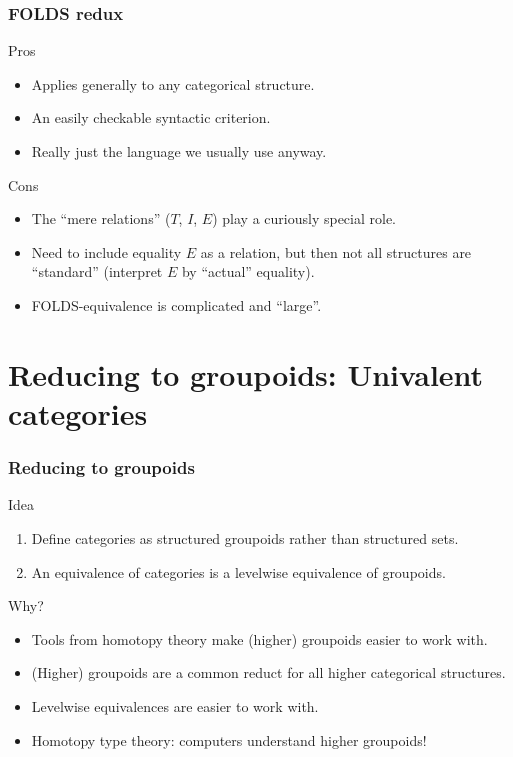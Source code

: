 \documentclass{beamer}
\begin{document}
\begin{frame}
  \frametitle{FOLDS redux}
  \begin{block}{Pros}
    \begin{itemize}
    \item Applies generally to any categorical structure.
    \item An easily checkable syntactic criterion.
    \item Really just the language we usually use anyway.
    \end{itemize}
  \end{block}
  \begin{block}{Cons}
    \begin{itemize}
    \item The ``mere relations'' ($T$, $I$, $E$) play a curiously special role.
    \item Need to include equality $E$ as a relation, but then not all structures are ``standard'' (interpret $E$ by ``actual'' equality).
    \item FOLDS-equivalence is complicated and ``large''.
    \end{itemize}
  \end{block}
\end{frame}

\section{Reducing to groupoids: Univalent categories}
\label{sec:univalence}

\begin{frame}
  \frametitle{Reducing to groupoids}
  \begin{block}{Idea}
    \begin{enumerate}
    \item Define categories as \alert<1>{structured groupoids} rather than structured sets.
    \item An equivalence of categories is a levelwise equivalence of groupoids.
    \end{enumerate}
  \end{block}
  Why?
  \begin{itemize}
  \item Tools from homotopy theory make (higher) groupoids easier to work with.
  \item (Higher) groupoids are a common reduct for all higher categorical structures.
  \item Levelwise equivalences are easier to work with.
  \item Homotopy type theory: computers understand higher groupoids!
  \end{itemize}
\end{frame}
\end{document}
